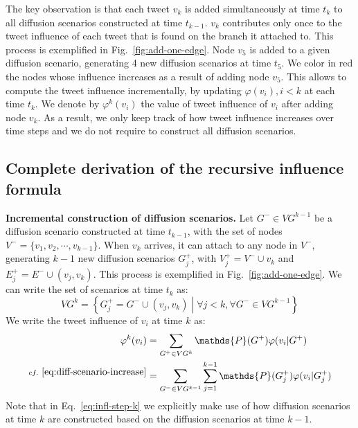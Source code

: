 The key observation is that each tweet $v_k$ is added simultaneously at time $t_k$ to all diffusion scenarios constructed at time $t_{k-1}$.
$v_k$ contributes only once to the tweet influence of each tweet that is found on the branch it attached to.
This process is exemplified in Fig.~\ref{fig:add-one-edge}.
Node $v_5$ is added to a given diffusion scenario, generating 4 new diffusion scenarios at time $t_5$.
We color in red the nodes whose influence increases as a result of adding node $v_5$.
%
This allows to compute the tweet influence incrementally, by updating $\varphi(v_i), i < k$ at each time $t_k$.
We denote by $\varphi^k(v_i)$ the value of tweet influence of $v_i$ after adding node $v_k$.
As a result, we only keep track of how tweet influence increases over time steps and we do not require to construct all diffusion scenarios.

\subsection{Complete derivation of the recursive influence formula}

\textbf{Incremental construction of diffusion scenarios.}
Let $G^- \in VG^{k-1}$ be a diffusion scenario constructed at time $t_{k-1}$, with the set of nodes $V^- = \{ v_1,v_2,\cdots,v_{k-1} \}$.
When $v_k$ arrives, it can attach to any node in $V^-$, generating $k-1$ new diffusion scenarios $G_j^+$, with $V_j^+ = V^- \cup v_k$ and $E_j^+ = E^- \cup (v_j, v_k)$.
This process is exemplified in Fig.~\ref{fig:add-one-edge}.
We can write the set of scenarios at time $t_k$ as:
\begin{equation} \label{eq:diff-scenario-increase}
	VG^k = \left\lbrace G_j^+ = G^- \cup (v_j, v_k) \middle| \forall j < k, \forall G^- \in VG^{k-1} \right\rbrace
\end{equation}     
We write the tweet influence of $v_i$ at time $k$ as:
%
%
% 
\begin{align}
	\varphi^k(v_i) &= \sum_{G^+ \in {VG^k}} \mathds{P}(G^+) \varphi(v_i|G^+) \nonumber \\
	^{cf.~\eqref{eq:diff-scenario-increase}} &= \sum_{G^- \in {VG^{k-1}}}\sum^{k-1}_{j=1}\mathds{P}(G_j^+) \varphi(v_i|G_j^+) \label{eq:infl-step-k}
\end{align}
Note that in Eq.~\eqref{eq:infl-step-k} we explicitly make use of how diffusion scenarios at time $k$ are constructed based on the diffusion scenarios at time $k-1$.

